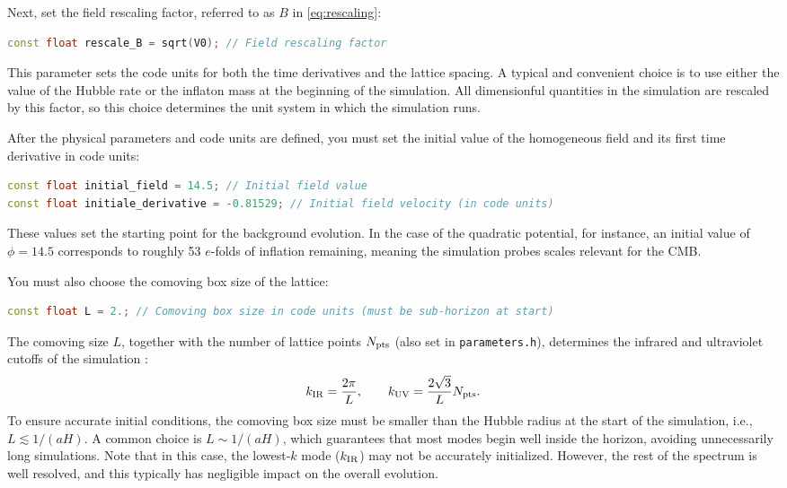 \documentclass[aps, nofootinbib,superscriptaddress, preprintnumbers, longbibliography]{article}
\begin{document}
Next, set the field rescaling factor, referred to as $B$ in \cref{eq:rescaling}:
\begin{lstlisting}[language=C++, firstnumber=56,caption={}]
const float rescale_B = sqrt(V0); // Field rescaling factor
\end{lstlisting}
This parameter sets the code units for both the time derivatives and the lattice spacing. A typical and convenient choice is to use either the value of the Hubble rate or the inflaton mass at the beginning of the simulation. All dimensionful quantities in the simulation are rescaled by this factor, so this choice determines the unit system in which the simulation runs.

After the physical parameters and code units are defined, you must set the initial value of the homogeneous field and its first time derivative in code units:
\begin{lstlisting}[language=C++, firstnumber=57,caption={}]
const float initial_field = 14.5; // Initial field value
const float initiale_derivative = -0.81529; // Initial field velocity (in code units)
\end{lstlisting}
These values set the starting point for the background evolution. In the case of the quadratic potential, for instance, an initial value of $\phi=14.5$ corresponds to roughly 53 $e$-folds of inflation remaining, meaning the simulation probes scales relevant for the CMB. 

You must also choose the comoving box size of the lattice:
\begin{lstlisting}[language=C++, firstnumber=57,caption={}]
const float L = 2.; // Comoving box size in code units (must be sub-horizon at start) 
\end{lstlisting}
The comoving size $L$, together with the number of lattice points $N_{\rm pts}$ (also set in \texttt{parameters.h}), determines the infrared and ultraviolet cutoffs of the simulation \cite{Caravano:2021pgc}:
\begin{equation}
k_{\rm IR} = \frac{2\pi}{L},\quad\quad k_{\rm UV} = \frac{2\sqrt{3}}{L}N_{\rm pts}.
\end{equation}
To ensure accurate initial conditions, the comoving box size must be smaller than the Hubble radius at the start of the simulation, i.e., $L \lesssim 1/(aH)$. A common choice is $L \sim 1/(aH)$, which guarantees that most modes begin well inside the horizon, avoiding unnecessarily long simulations. Note that in this case, the lowest-$k$ mode ($k_{\rm IR}$) may not be accurately initialized. However, the rest of the spectrum is well resolved, and this typically has negligible impact on the overall evolution.
\end{document}
